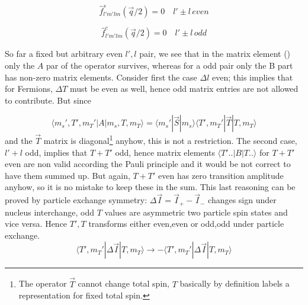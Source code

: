 \documentclass[11pt,a4paper]{article}
\begin{document}
\begin{equation}
\hat f_{l'm'lm}^s (\vec q /2) = 0 \quad l' \pm l \, even
\end{equation}

\begin{equation}
\hat f_{l'm'lm}^c (\vec q /2) = 0 \quad l' \pm l \, odd
\end{equation}

So far a fixed but arbitrary even $l',l$ pair, we see that in the matrix element () only the $A$ par of the operator survives,
whereas for a odd pair only the B part has non-zero matrix elements. Consider first the case $\Delta l$ even; this implies that
for Fermions, $\Delta T$ must be even as well, hence odd matrix entries are not allowed to contribute. But since 

\begin{equation}
\langle m_s', T', m_T' | A |m_s, T, m_T \rangle
=
\langle m_s' | \vec S | m_s \rangle 
\langle T', m_T' | \vec T | T, m_T \rangle
\end{equation}
and the $ \vec T $ matrix is diagonal\footnote{The operator $ \vec T $ cannot change total spin, $T$ basically by definition
labels a representation for fixed total spin.} anyhow, this is not a restriction. The second case, $l' + l$ odd, implies that
$T + T'$ odd, hence matrix elements $\langle T'..|B|T..\rangle$ for $T + T'$ even are non valid according the Pauli principle
and it would be not correct to have them summed up. But again, $T + T'$ even has zero transition amplitude anyhow, so it is
no mistake to keep these in the sum. This last reasoning can be proved by particle exchange symmetry: $\Delta \vec I = \vec I_{+} - \vec I_{-}$
changes sign under nucleus interchange, odd $T$ values are asymmetric two particle spin states and vice versa. Hence
$T',T$ transforms either even,even or odd,odd under particle exchange.
\begin{equation}
\langle T', m_T' | \Delta \vec I| T, m_T \rangle \rightarrow
- \langle T', m_T' | \Delta \vec I| T, m_T \rangle
\end{equation}
\end{document}
